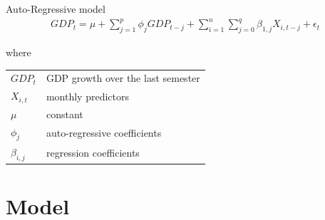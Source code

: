 \documentclass[12pt,a4paper,oneside]{book}
\begin{document}
Auto-Regressive model
\begin{eqnarray}
    GDP_{t} = \mu + \sum^p_{j = 1} \phi_j GDP_{t-j} +         \sum^n_{i = 1} \sum^q_{j = 0}
       \beta_{1,j} X_{i,t-j} + \epsilon_t 
\end{eqnarray}

where   \\
\begin{tabular}{l l}
    $GDP_t$     & GDP growth over the last semester \\
    $X_{i,t}$   & monthly predictors \\
    $\mu$       & constant \\
    $\phi_j$    & auto-regressive coefficients \\
    $\beta_{i,j}$ & regression coefficients \\
\end{tabular}



\section{Model}
\end{document}

